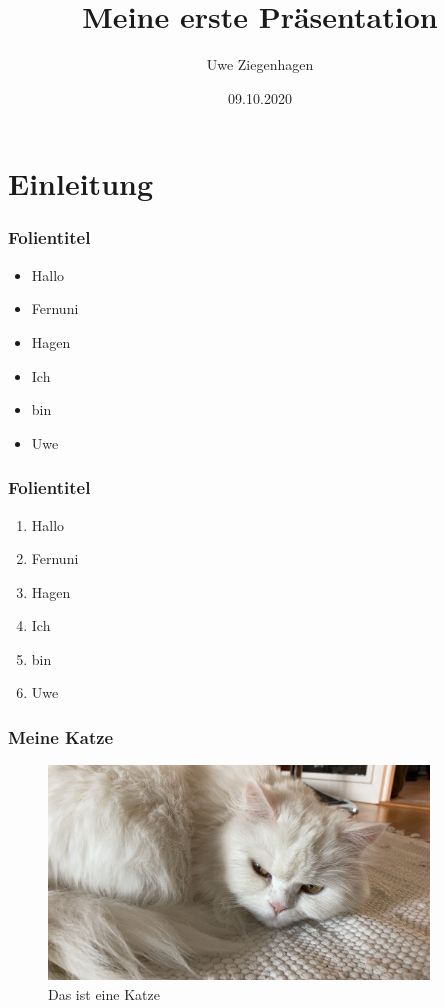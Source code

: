 \documentclass[ngerman]{beamer}
\author{Uwe Ziegenhagen}
\title{Meine erste Präsentation}
\institute{Fernuni Hagen, Lehrstuhl Informatik}
\date{09.10.2020}
\begin{document}
\begin{frame}

\maketitle
	
\end{frame}

\begin{frame}
	
\tableofcontents
	
\end{frame}

\section{Einleitung}

\begin{frame}
	\frametitle{Folientitel}
	
	\begin{itemize}
		\item Hallo
		\item Fernuni
		\item Hagen
		\item Ich 
		\item bin 
		\item Uwe
	\end{itemize}

\end{frame}
	
\begin{frame}
	\frametitle{Folientitel}
	
	\begin{enumerate}
		\item Hallo
		\item Fernuni
		\item Hagen
		\item Ich 
		\item bin 
		\item Uwe
	\end{enumerate}
	
\end{frame}

\begin{frame}
	\frametitle{Meine Katze}
	
\begin{figure}[htb]
	\centering
	\includegraphics[width=0.9\textwidth]{miau.jpg}
	\caption{Das ist eine Katze}\label{fig:mieze2}
\end{figure}
	
\end{frame}
\end{document}
